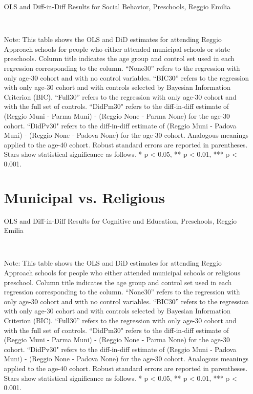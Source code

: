 \begin{landscape}
\begin{table}[H] \caption{OLS and Diff-in-Diff Results for Social Behavior, Preschools, Reggio Emilia} \label{ols-S-reg}
\scalebox{0.85}{
}
\vspace{1ex} \\
\footnotesize\raggedright{Note: This table shows the OLS and DiD estimates for attending Reggio Approach schools for people who either attended municipal schools or state preschools. Column title indicates the age group and control set used in each regression corresponding to the column. ``None30'' refers to the regression with only age-30 cohort and with no control variables. ``BIC30'' refers to the regression with only age-30 cohort and with controls selected by Bayesian Information Criterion (BIC). ``Full30'' refers to the regression with only age-30 cohort and with the full set of controls. ``DidPm30" refers to the diff-in-diff estimate of (Reggio Muni - Parma Muni) - (Reggio None - Parma None) for the age-30 cohort. ``DidPv30" refers to the diff-in-diff estimate of (Reggio Muni - Padova Muni) - (Reggio None - Padova None) for the age-30 cohort. Analogous meanings applied to the age-40 cohort. Robust standard errors are reported in parentheses. Stars show statistical significance as follows. * p < 0.05, ** p < 0.01, *** p < 0.001.}
\end{table}




\section{Municipal vs. Religious}
\begin{table}[H] \caption{OLS and Diff-in-Diff Results for Cognitive and Education, Preschools, Reggio Emilia} \label{ols-E-reg}
\scalebox{0.85}{}
\vspace{1ex} \\
\footnotesize\raggedright{Note: This table shows the OLS and DiD estimates for attending Reggio Approach schools for people who either attended municipal schools or religious preschool. Column title indicates the age group and control set used in each regression corresponding to the column. ``None30'' refers to the regression with only age-30 cohort and with no control variables. ``BIC30'' refers to the regression with only age-30 cohort and with controls selected by Bayesian Information Criterion (BIC). ``Full30'' refers to the regression with only age-30 cohort and with the full set of controls. ``DidPm30" refers to the diff-in-diff estimate of (Reggio Muni - Parma Muni) - (Reggio None - Parma None) for the age-30 cohort. ``DidPv30" refers to the diff-in-diff estimate of (Reggio Muni - Padova Muni) - (Reggio None - Padova None) for the age-30 cohort. Analogous meanings applied to the age-40 cohort. Robust standard errors are reported in parentheses. Stars show statistical significance as follows. * p < 0.05, ** p < 0.01, *** p < 0.001.}
\end{table}


\end{landscape}
